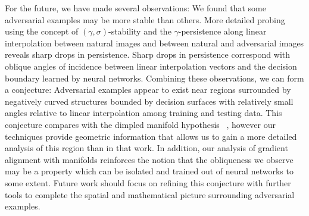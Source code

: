 For the future, we have made several observations: We found that some adversarial examples may be more stable than others. More detailed probing using the concept of $(\gamma,\sigma)$-stability and the $\gamma$-persistence along linear interpolation between natural images and between natural and adversarial images reveals sharp drops in persistence. Sharp drops in persistence correspond with oblique angles of incidence between linear interpolation vectors and the decision boundary learned by neural networks. Combining these observations, we can form a conjecture: Adversarial examples appear to exist near regions surrounded by negatively curved structures bounded by decision surfaces with relatively small angles relative to linear interpolation among training and testing data. This conjecture compares with the dimpled manifold hypothesis ~\citep{shamir2021dimpled}, however our techniques provide geometric information that allows us to gain a more detailed analysis of this region than in that work. In addition, our analysis of gradient alignment with manifolds reinforces the notion that the obliqueness we observe may be a property which can be isolated and trained out of neural networks to some extent. Future work should focus on refining this conjecture with further tools to complete the spatial and mathematical picture surrounding adversarial examples.


